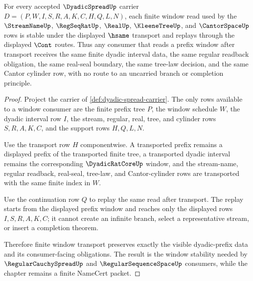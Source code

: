 \begin{theorem}
\label{thm:dyadic-spread-window-stability}
For every accepted $\DyadicSpreadUp$ carrier $D=(P,W,I,S,R,A,K,C,H,Q,L,N)$, each finite window read used by the $\StreamNameUp$, $\RegSeqRatUp$, $\RealUp$, $\KleeneTreeUp$, and $\CantorSpaceUp$ rows is stable under the displayed $\hsame$ transport and replays through the displayed $\Cont$ routes. Thus any consumer that reads a prefix window after transport receives the same finite dyadic interval data, the same regular readback obligation, the same real-seal boundary, the same tree-law decision, and the same Cantor cylinder row, with no route to an uncarried branch or completion principle.
\end{theorem}
\begin{proof}
Project the carrier of \autoref{def:dyadic-spread-carrier}. The only rows available to a window consumer are the finite prefix tree $P$, the window schedule $W$, the dyadic interval row $I$, the stream, regular, real, tree, and cylinder rows $S,R,A,K,C$, and the support rows $H,Q,L,N$.

Use the transport row $H$ componentwise. A transported prefix remains a displayed prefix of the transported finite tree, a transported dyadic interval remains the corresponding $\DyadicRatCoreUp$ window, and the stream-name, regular readback, real-seal, tree-law, and Cantor-cylinder rows are transported with the same finite index in $W$.

Use the continuation row $Q$ to replay the same read after transport. The replay starts from the displayed prefix window and reaches only the displayed rows $I,S,R,A,K,C$; it cannot create an infinite branch, select a representative stream, or insert a completion theorem.

Therefore finite window transport preserves exactly the visible dyadic-prefix data and its consumer-facing obligations. The result is the window stability needed by $\RegularCauchySpreadUp$ and $\RegularSequenceSpaceUp$ consumers, while the chapter remains a finite NameCert packet.
\end{proof}


